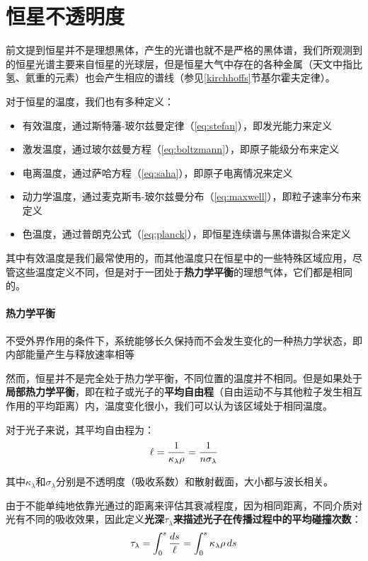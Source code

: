 \documentclass[openany]{ctexbook}
\begin{document}
\section{恒星不透明度}
前文提到恒星并不是理想黑体，产生的光谱也就不是严格的黑体谱，我们所观测到的恒星光谱主要来自恒星的光球层，但是恒星大气中存在的各种金属（天文中指比氢、氦重的元素）也会产生相应的谱线（参见\ref{kirchhoffs}节基尔霍夫定律）。

对于恒星的温度，我们也有多种定义：
\begin{itemize}
  \item 有效温度，通过斯特藩-玻尔兹曼定律（\ref{eq:stefan}），即发光能力来定义
  \item 激发温度，通过玻尔兹曼方程（\ref{eq:boltzmann}），即原子能级分布来定义
  \item 电离温度，通过萨哈方程（\ref{eq:saha}），即原子电离情况来定义
  \item 动力学温度，通过麦克斯韦-玻尔兹曼分布（\ref{eq:maxwell}），即粒子速率分布来定义
  \item 色温度，通过普朗克公式（\ref{eq:planck}），即恒星连续谱与黑体谱拟合来定义
\end{itemize}

其中有效温度是我们最常使用的，而其他温度只在恒星中的一些特殊区域应用，尽管这些温度定义不同，但是对于一团处于\textbf{热力学平衡}的理想气体，它们都是相同的。

\paragraph{热力学平衡}
不受外界作用的条件下，系统能够长久保持而不会发生变化的一种热力学状态，即内部能量产生与释放速率相等


然而，恒星并不是完全处于热力学平衡，不同位置的温度并不相同。但是如果处于\textbf{局部热力学平衡}，即在粒子或光子的\textbf{平均自由程}（自由运动不与其他粒子发生相互作用的平均距离）内，温度变化很小，我们可以认为该区域处于相同温度。

对于光子来说，其平均自由程为：
\begin{equation}
  \ell={1\over \kappa_\lambda \rho}={1\over n \sigma_\lambda}
\end{equation}

其中$\kappa_\lambda$和$\sigma_\lambda$分别是不透明度（吸收系数）和散射截面，大小都与波长相关。

由于不能单纯地依靠光通过的距离来评估其衰减程度，因为相同距离，不同介质对光有不同的吸收效果，因此定义\textbf{光深$\tau_\lambda$来描述光子在传播过程中的平均碰撞次数}：
\begin{equation}
  \tau_\lambda=\int^s_0{ds\over \ell}=\int_0^s\kappa_\lambda\rho\,ds
\end{equation}
\end{document}
